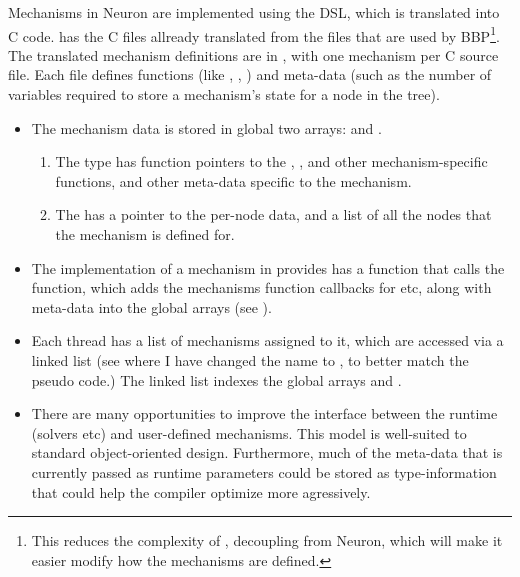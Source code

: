 \noindent
Mechanisms in Neuron are implemented using the \hoc DSL, which is translated into C code.
\neuron has the C files allready translated from the \hoc files that are used by BBP\footnote{This reduces the complexity of \neuron, decoupling \neuron from Neuron, which will make it easier modify how the mechanisms are defined.}.
The translated mechanism definitions are in , with one mechanism per C source file.
Each file defines functions (like , , ) and meta-data (such as the number of variables required to store a mechanism's state for a node in the tree).
\begin{itemize}
\item
    The mechanism data is stored in global two arrays:  and .
    \begin{enumerate}
    \item
        The  type has function pointers to the , ,  and other mechanism-specific functions, and other meta-data specific to the mechanism.
    \item
        The  has a pointer to the per-node data, and a list of all the nodes that the mechanism is defined for.
    \end{enumerate}
\item
    The implementation of a mechanism in  provides has a function  that calls the  function, which adds the mechanisms function callbacks for  etc, along with meta-data into the global arrays (see ).
\item
    Each thread has a list of mechanisms assigned to it, which are accessed via a linked list  (see  where I have changed the name  to , to better match the pseudo code.) The linked list indexes the global arrays  and  .
\item
    There are many opportunities to improve the interface between the runtime (solvers etc) and user-defined mechanisms.
    This model is well-suited to standard object-oriented design.
    Furthermore, much of the meta-data that is currently passed as runtime parameters could be stored as type-information that could help the compiler optimize more agressively.
\end{itemize}


